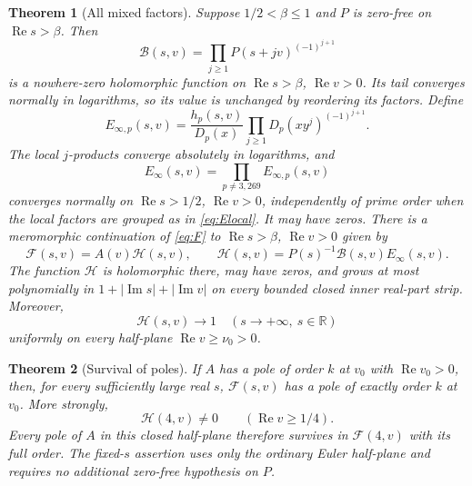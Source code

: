 \documentclass[11pt]{article}
\numberwithin{equation}{section}
\newcommand{\F}{\mathcal F}
\newcommand{\B}{\mathcal B}
\newcommand{\HH}{\mathcal H}
\newcommand{\Rea}{\operatorname{Re}}
\newcommand{\Ima}{\operatorname{Im}}
\newtheorem{theorem}{Theorem}[section]
\begin{document}
\begin{theorem}[All mixed factors]\label{thm:mixed}
Suppose $1/2<\beta\le1$ and $P$ is zero-free on $\Rea s>\beta$.
Then
\begin{equation}\label{eq:B}
 \B(s,v)=\prod_{j\ge1}P(s+jv)^{(-1)^{j+1}}
\end{equation}
is a nowhere-zero holomorphic function on
$\Rea s>\beta$, $\Rea v>0$. Its tail converges normally in logarithms,
so its value is unchanged by reordering its factors. Define
\begin{equation}\label{eq:Elocal}
 E_{\infty,p}(s,v)=
 \frac{h_p(s,v)}{D_p(x)}
 \prod_{j\ge1}D_p(xy^j)^{(-1)^{j+1}}.
\end{equation}
The local $j$-products converge absolutely in logarithms, and
\begin{equation}\label{eq:E}
 E_\infty(s,v)=\prod_{p\ne3,269}E_{\infty,p}(s,v)
\end{equation}
converges normally on $\Rea s>1/2$, $\Rea v>0$, independently of
prime order when the local factors are grouped as in
\eqref{eq:Elocal}. It may have zeros. There is a meromorphic
continuation of \eqref{eq:F} to $\Rea s>\beta$, $\Rea v>0$ given by
\begin{equation}\label{eq:factor}
 \F(s,v)=A(v)\HH(s,v),\qquad
 \HH(s,v)=P(s)^{-1}\B(s,v)E_\infty(s,v).
\end{equation}
The function $\HH$ is holomorphic there, may have zeros, and grows
at most polynomially in $1+|\Ima s|+|\Ima v|$ on every bounded
closed inner real-part strip. Moreover,
\begin{equation}\label{eq:limit}
 \HH(s,v)\longrightarrow1\quad(s\longrightarrow+\infty,
 \ s\in\mathbb R)
\end{equation}
uniformly on every half-plane $\Rea v\ge\nu_0>0$.
\end{theorem}

\begin{theorem}[Survival of poles]\label{thm:poles}
If $A$ has a pole of order $k$ at $v_0$ with $\Rea v_0>0$, then,
for every sufficiently large real $s$, $\F(s,v)$ has a pole of
exactly order $k$ at $v_0$. More strongly,
\begin{equation}\label{eq:s4}
 \HH(4,v)\ne0\qquad(\Rea v\ge1/4).
\end{equation}
Every pole of $A$ in this closed half-plane therefore survives in
$\F(4,v)$ with its full order. The fixed-$s$ assertion uses only
the ordinary Euler half-plane and requires no additional zero-free
hypothesis on $P$.
\end{theorem}
\end{document}
